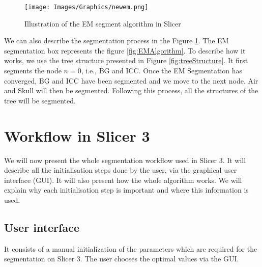   \begin{figure}[ht]\centering
  \texttt{[image: Images/Graphics/newem.png]}
  \caption{Illustration of the EM segment algorithm in Slicer}\label{fig:EMSSlicer}
  \end{figure}
  
We can also describe the segmentation process in the Figure \ref{fig:EMSSlicer}. The EM segmentation box represents the figure \ref{fig:EMAlgorithm}. To describe how it works, we use the tree structure presented in Figure \ref{fig:treeStructure}. It first segments the node $n=0$, i.e., BG and ICC. Once the EM Segmentation has converged, BG and ICC have been segmented and we move to the next node. Air and Skull will then be segmented. Following this process, all the structures of the tree will be segmented.
%
\section{Workflow in Slicer 3}
We will now present the whole segmentation workflow used in Slicer 3. It will describe all the initialisation steps done by the user, via the graphical user interface (GUI). It will also present how the whole algorithm works. We will explain why each initialisation step is important and where this information is used.
%
\subsection{User interface}\label{GUI}
It consists of a manual initialization of the parameters which are required for the segmentation on Slicer 3. The user chooses the optimal values via the GUI.

